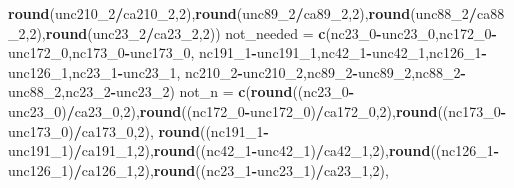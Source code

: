 \documentclass[
]{article}
\newenvironment{Shaded}{\begin{snugshade}}{\end{snugshade}}
\newcommand{\DecValTok}[1]{\textcolor[rgb]{0.00,0.00,0.81}{#1}}
\newcommand{\KeywordTok}[1]{\textcolor[rgb]{0.13,0.29,0.53}{\textbf{#1}}}
\newcommand{\NormalTok}[1]{#1}
\newcommand{\OperatorTok}[1]{\textcolor[rgb]{0.81,0.36,0.00}{\textbf{#1}}}
\newcommand{\StringTok}[1]{\textcolor[rgb]{0.31,0.60,0.02}{#1}}
\begin{document}
\begin{Shaded}
\begin{Highlighting}[]
          \KeywordTok{round}\NormalTok{(unc210_}\DecValTok{2}\OperatorTok{/}\NormalTok{ca210_}\DecValTok{2}\NormalTok{,}\DecValTok{2}\NormalTok{),}\KeywordTok{round}\NormalTok{(unc89_}\DecValTok{2}\OperatorTok{/}\NormalTok{ca89_}\DecValTok{2}\NormalTok{,}\DecValTok{2}\NormalTok{),}\KeywordTok{round}\NormalTok{(unc88_}\DecValTok{2}\OperatorTok{/}\NormalTok{ca88_}\DecValTok{2}\NormalTok{,}\DecValTok{2}\NormalTok{),}\KeywordTok{round}\NormalTok{(unc23_}\DecValTok{2}\OperatorTok{/}\NormalTok{ca23_}\DecValTok{2}\NormalTok{,}\DecValTok{2}\NormalTok{))}
\NormalTok{not_needed =}\StringTok{ }\KeywordTok{c}\NormalTok{(nc23_}\DecValTok{0}\OperatorTok{-}\NormalTok{unc23_}\DecValTok{0}\NormalTok{,nc172_}\DecValTok{0}\OperatorTok{-}\NormalTok{unc172_}\DecValTok{0}\NormalTok{,nc173_}\DecValTok{0}\OperatorTok{-}\NormalTok{unc173_}\DecValTok{0}\NormalTok{,}
\NormalTok{               nc191_}\DecValTok{1}\OperatorTok{-}\NormalTok{unc191_}\DecValTok{1}\NormalTok{,nc42_}\DecValTok{1}\OperatorTok{-}\NormalTok{unc42_}\DecValTok{1}\NormalTok{,nc126_}\DecValTok{1}\OperatorTok{-}\NormalTok{unc126_}\DecValTok{1}\NormalTok{,nc23_}\DecValTok{1}\OperatorTok{-}\NormalTok{unc23_}\DecValTok{1}\NormalTok{,}
\NormalTok{               nc210_}\DecValTok{2}\OperatorTok{-}\NormalTok{unc210_}\DecValTok{2}\NormalTok{,nc89_}\DecValTok{2}\OperatorTok{-}\NormalTok{unc89_}\DecValTok{2}\NormalTok{,nc88_}\DecValTok{2}\OperatorTok{-}\NormalTok{unc88_}\DecValTok{2}\NormalTok{,nc23_}\DecValTok{2}\OperatorTok{-}\NormalTok{unc23_}\DecValTok{2}\NormalTok{)}
\NormalTok{not_n =}\StringTok{ }\KeywordTok{c}\NormalTok{(}\KeywordTok{round}\NormalTok{((nc23_}\DecValTok{0}\OperatorTok{-}\NormalTok{unc23_}\DecValTok{0}\NormalTok{)}\OperatorTok{/}\NormalTok{ca23_}\DecValTok{0}\NormalTok{,}\DecValTok{2}\NormalTok{),}\KeywordTok{round}\NormalTok{((nc172_}\DecValTok{0}\OperatorTok{-}\NormalTok{unc172_}\DecValTok{0}\NormalTok{)}\OperatorTok{/}\NormalTok{ca172_}\DecValTok{0}\NormalTok{,}\DecValTok{2}\NormalTok{),}\KeywordTok{round}\NormalTok{((nc173_}\DecValTok{0}\OperatorTok{-}\NormalTok{unc173_}\DecValTok{0}\NormalTok{)}\OperatorTok{/}\NormalTok{ca173_}\DecValTok{0}\NormalTok{,}\DecValTok{2}\NormalTok{),}
          \KeywordTok{round}\NormalTok{((nc191_}\DecValTok{1}\OperatorTok{-}\NormalTok{unc191_}\DecValTok{1}\NormalTok{)}\OperatorTok{/}\NormalTok{ca191_}\DecValTok{1}\NormalTok{,}\DecValTok{2}\NormalTok{),}\KeywordTok{round}\NormalTok{((nc42_}\DecValTok{1}\OperatorTok{-}\NormalTok{unc42_}\DecValTok{1}\NormalTok{)}\OperatorTok{/}\NormalTok{ca42_}\DecValTok{1}\NormalTok{,}\DecValTok{2}\NormalTok{),}\KeywordTok{round}\NormalTok{((nc126_}\DecValTok{1}\OperatorTok{-}\NormalTok{unc126_}\DecValTok{1}\NormalTok{)}\OperatorTok{/}\NormalTok{ca126_}\DecValTok{1}\NormalTok{,}\DecValTok{2}\NormalTok{),}\KeywordTok{round}\NormalTok{((nc23_}\DecValTok{1}\OperatorTok{-}\NormalTok{unc23_}\DecValTok{1}\NormalTok{)}\OperatorTok{/}\NormalTok{ca23_}\DecValTok{1}\NormalTok{,}\DecValTok{2}\NormalTok{),}

\end{Highlighting}
\end{Shaded}
\end{document}
